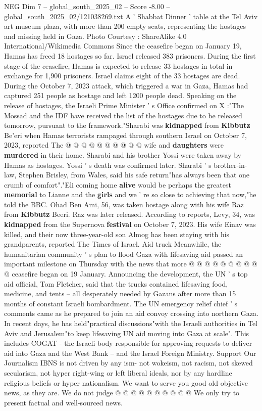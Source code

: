 \begin{textsample}{NEG Dim 7 – global\_south\_2025\_02 – Score -8.00 – global\_south\_2025\_02/121038269.txt}  \label{ex:f7_neg_264}
A ' Shabbat Dinner ' table at the Tel Aviv art museum plaza, with more than 200 empty seats, representing the hostages and missing held in Gaza.
Photo Courtesy : ShareAlike 4.0 International/Wikimedia Commons Since the ceasefire began on January 19, Hamas has freed 18 hostages so far.
Israel released 383 prisoners.
During the first stage of the ceasefire, Hamas is expected to release 33 hostages in total in exchange for 1,900 prisoners.
Israel claims eight of the 33 hostages are dead.
During the October 7, 2023 attack, which triggered a war in Gaza, Hamas had captured 251 people as hostage and left 1200 people dead.
Speaking on the release of hostages, the Israeli Prime Minister ' s Office confirmed on X :"The Mossad and the IDF have received the list of the hostages due to be released tomorrow, pursuant to the framework."Sharabi was \textbf{kidnapped} from \textbf{Kibbutz} Be'eri when Hamas terrorists rampaged through southern Israel on October 7, 2023, reported The @ @ @ @ @ @ @ @ @ @ wife and \textbf{daughters} were \textbf{murdered} in their home.
Sharabi and his brother Yossi were taken away by Hamas as hostages.
Yossi ' s death was confirmed later.
Sharabi ' s brother-in-law, Stephen Brisley, from Wales, said his safe return"has always been that one crumb of comfort"."Eli coming home \textbf{alive} would be perhaps the greatest \textbf{memorial} to Lianne and the \textbf{girls} and we ' re so close to achieving that now,"he told the BBC.
Ohad Ben Ami, 56, was taken hostage along with his wife Raz from \textbf{Kibbutz} Beeri.
Raz was later released.
According to reports, Levy, 34, was \textbf{kidnapped} from the Supernova \textbf{festival} on October 7, 2023.
His wife Einav was killed, and their now three-year-old son Almog has been staying with his grandparents, reported The Times of Israel.
Aid truck Meanwhile, the humanitarian community ' s plan to flood Gaza with lifesaving aid passed an important milestone on Thursday with the news that more @ @ @ @ @ @ @ @ @ @ ceasefire began on 19 January.
Announcing the development, the UN ' s top aid official, Tom Fletcher, said that the trucks contained lifesaving food, medicine, and tents -- all desperately needed by Gazans after more than 15 months of constant Israeli bombardment.
The UN emergency relief chief ' s comments came as he prepared to join an aid convoy crossing into northern Gaza.
In recent days, he has held"practical discussions"with the Israeli authorities in Tel Aviv and Jerusalem"to keep lifesaving UN aid moving into Gaza at scale".
This includes COGAT - the Israeli body responsible for approving requests to deliver aid into Gaza and the West Bank -- and the Israel Foreign Ministry.
Support Our Journalism IBNS is not driven by any ism- not wokeism, not racism, not skewed secularism, not hyper right-wing or left liberal ideals, nor by any hardline religious beliefs or hyper nationalism.
We want to serve you good old objective news, as they are.
We do not judge @ @ @ @ @ @ @ @ @ @ We only try to present factual and well-sourced news.

\end{textsample}
